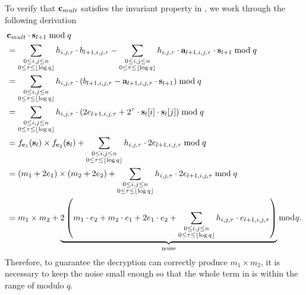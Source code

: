 \documentclass[../main.tex]{subfiles}
\begin{document}
To verify that $\mathbf{c}_{mult}$ satisfies the invariant property in , we work through the following derivation  
\begin{align}
\label{eq:homoMultPf}
    &\mathbf{c}_{mult} \cdot \mathbf{s}_{l+1} \bmod q \nonumber \\
    &= \sum_{\substack{0 \le i,j \le n \\ 0 \le \tau \le \lfloor \log q \rfloor }} h_{i,j,\tau} \cdot b_{l+1,i,j,\tau} - \sum_{\substack{0 \le i,j \le n \\ 0 \le \tau \le \lfloor \log q \rfloor }} h_{i,j,\tau} \cdot \mathbf{a}_{l+1,i,j,\tau} \cdot \mathbf{s}_{l+1} \bmod q \nonumber \\
    &= \sum_{\substack{0 \le i,j \le n \\ 0 \le \tau \le \lfloor \log q \rfloor }} h_{i,j,\tau} \cdot \left(b_{l+1,i,j,\tau} - \mathbf{a}_{l+1,i,j,\tau} \cdot \mathbf{s}_{l+1}\right) \bmod q \nonumber \\
    &= \sum_{\substack{0 \le i,j \le n \\ 0 \le \tau \le \lfloor \log q \rfloor }} h_{i,j,\tau} \cdot \left(2 e_{l+1,i,j,\tau} + 2^{\tau} \cdot \mathbf{s}_l[i] \cdot \mathbf{s}_l[j] \right) \bmod q \nonumber \\
    &= f_{\mathbf{c}_1}(\mathbf{s}_l) \times f_{\mathbf{c}_2}(\mathbf{s}_l) + \sum_{\substack{0 \le i,j \le n \\ 0 \le \tau \le \lfloor \log q \rfloor }} h_{i,j,\tau} \cdot 2 e_{l+1,i,j,\tau} \bmod q \nonumber \\
    &= (m_1+2e_1) \times (m_2 +2e_2) + \sum_{\substack{0 \le i,j \le n \\ 0 \le \tau \le \lfloor \log q \rfloor }} h_{i,j,\tau} \cdot 2 e_{l+1,i,j,\tau} \bmod q \nonumber \\
    &= m_1 \times m_2 + \underbrace{2 \left( m_1 \cdot e_2 + m_2 \cdot e_1 + 2 e_1 \cdot e_2 + \sum_{\substack{0 \le i,j \le n \\ 0 \le \tau \le \lfloor \log q \rfloor }} h_{i,j,\tau} \cdot e_{l+1,i,j,\tau} \right)}_{\text{noise}}\bmod q . 
\end{align}
Therefore, to guarantee the decryption can correctly produce $m_1 \times m_2$, it is necessary to keep the noise small enough so that the whole term in  is within the range of modulo $q$. 
\end{document}

